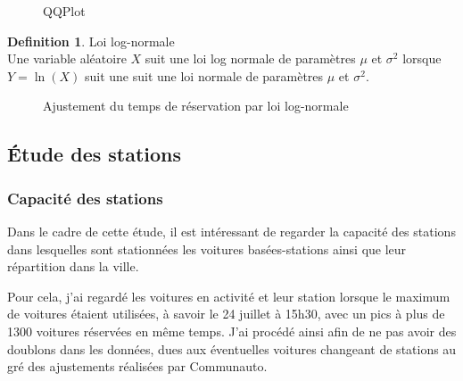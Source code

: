 \documentclass[12pt,a4paper]{article}
\newcommand{\1}[1]{\mathbbm{1}_{\{#1\}} }
\theoremstyle{definition}
\newtheorem{definition}{Definition}
\begin{document}
{\begin{figure}[h]
\caption{QQPlot}
\end{figure}

\begin{definition}{Loi log-normale}\\
Une variable aléatoire $X$ suit une loi log normale de paramètres $\mu$ et $\sigma^2$ lorsque $Y = \ln(X)$ suit une suit une loi normale de paramètres $\mu$ et $\sigma^2$.
\end{definition}


\begin{figure}[!h]
\centering
{}
\caption{Ajustement du temps de réservation par loi log-normale}
\end{figure}

\subsection{Étude des stations}

\subsubsection{Capacité des stations}
Dans le cadre de cette étude, il est intéressant de regarder la capacité des stations dans lesquelles sont stationnées les voitures basées-stations ainsi que leur répartition dans la ville.

Pour cela, j'ai regardé les voitures en activité et leur station lorsque le maximum de voitures étaient utilisées, à savoir le 24 juillet à 15h30, avec un pics à plus de 1300 voitures réservées en même temps. J'ai procédé ainsi afin de ne pas avoir des doublons dans les données, dues aux éventuelles voitures changeant de stations au gré des ajustements réalisées par Communauto.

}
\end{document}
